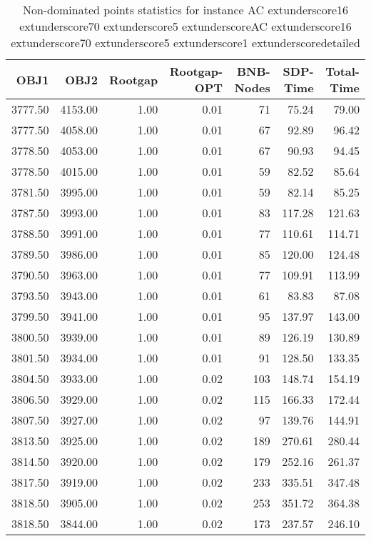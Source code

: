 \begin{table}
\caption{Non-dominated points statistics for instance AC	extunderscore16	extunderscore70	extunderscore5	extunderscoreAC	extunderscore16	extunderscore70	extunderscore5	extunderscore1	extunderscoredetailed}
\label{tab:stats/AC_16_70_5_AC_16_70_5_1_detailed}
\begin{tabular}{rrrrrrr}
\toprule
OBJ1 & OBJ2 & Rootgap & Rootgap-OPT & BNB-Nodes & SDP-Time & Total-Time \\
\midrule
3777.50 & 4153.00 & 1.00 & 0.01 & 71 & 75.24 & 79.00 \\
3777.50 & 4058.00 & 1.00 & 0.01 & 67 & 92.89 & 96.42 \\
3778.50 & 4053.00 & 1.00 & 0.01 & 67 & 90.93 & 94.45 \\
3778.50 & 4015.00 & 1.00 & 0.01 & 59 & 82.52 & 85.64 \\
3781.50 & 3995.00 & 1.00 & 0.01 & 59 & 82.14 & 85.25 \\
3787.50 & 3993.00 & 1.00 & 0.01 & 83 & 117.28 & 121.63 \\
3788.50 & 3991.00 & 1.00 & 0.01 & 77 & 110.61 & 114.71 \\
3789.50 & 3986.00 & 1.00 & 0.01 & 85 & 120.00 & 124.48 \\
3790.50 & 3963.00 & 1.00 & 0.01 & 77 & 109.91 & 113.99 \\
3793.50 & 3943.00 & 1.00 & 0.01 & 61 & 83.83 & 87.08 \\
3799.50 & 3941.00 & 1.00 & 0.01 & 95 & 137.97 & 143.00 \\
3800.50 & 3939.00 & 1.00 & 0.01 & 89 & 126.19 & 130.89 \\
3801.50 & 3934.00 & 1.00 & 0.01 & 91 & 128.50 & 133.35 \\
3804.50 & 3933.00 & 1.00 & 0.02 & 103 & 148.74 & 154.19 \\
3806.50 & 3929.00 & 1.00 & 0.02 & 115 & 166.33 & 172.44 \\
3807.50 & 3927.00 & 1.00 & 0.02 & 97 & 139.76 & 144.91 \\
3813.50 & 3925.00 & 1.00 & 0.02 & 189 & 270.61 & 280.44 \\
3814.50 & 3920.00 & 1.00 & 0.02 & 179 & 252.16 & 261.37 \\
3817.50 & 3919.00 & 1.00 & 0.02 & 233 & 335.51 & 347.48 \\
3818.50 & 3905.00 & 1.00 & 0.02 & 253 & 351.72 & 364.38 \\
3818.50 & 3844.00 & 1.00 & 0.02 & 173 & 237.57 & 246.10 \\
\bottomrule
\end{tabular}
\end{table}
